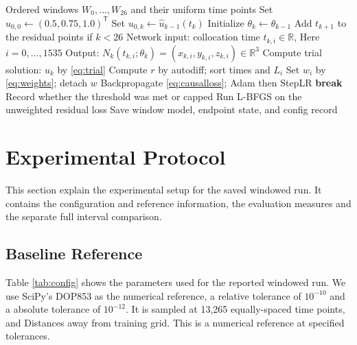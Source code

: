 \documentclass[conference]{IEEEtran}
\begin{document}
\begin{algorithm}[t]
\caption{Sequential causal window training}
\label{alg:training}
\begin{algorithmic}[1]
\Require Ordered windows $W_0,\ldots,W_{26}$ and their uniform time points
\State Set $u_{0,0}\gets (0.5,0.75,1.0)^\mathsf{T}$
    \State Set $u_{0,k}\gets\hat{u}_{k-1}(t_k)$
    \State Initialize $\theta_k\gets\theta_{k-1}$
  \EndIf
  \State Add $t_{k+1}$ to the residual points if $k<26$
      \State Network input: collocation time $t_{k,i}\in\mathbb{R}$, 
        \State Here  $i=0,\ldots,1535$
      \State Output: $N_k(t_{k,i};\theta_k)=(x_{k,i},y_{k,i},z_{k,i})\in\mathbb{R}^3$
      \State Compute trial solution: $u_k$ by \eqref{eq:trial}
      \State Compute $r$ by autodiff; sort times and $L_i$
      \State Set $w_i$ by \eqref{eq:weights}; detach $w$
      \State Backpropagate \eqref{eq:causalloss}; Adam then StepLR
        \State \textbf{break}
      \EndIf
    \EndFor
    \State Record whether the threshold was met or capped
  \EndFor
  \State Run L-BFGS on the unweighted residual loss
  \State Save window model, endpoint state, and config record
\EndFor
\end{algorithmic}
\end{algorithm}

\section{Experimental Protocol}
This section explain the experimental setup for the saved windowed run. It contains the configuration and reference information, the evaluation measures and the separate full interval comparison.




\subsection{Baseline Reference}




Table \ref{tab:config} shows the parameters used for the reported windowed run. We use SciPy’s DOP853 \cite{virtanen2020} as the numerical reference, a relative tolerance of $10^{-10}$ and a absolute tolerance of $10^{-12}$. It is sampled at 13,265 equally-spaced time points, and Distances away from training grid. This is a numerical reference at specified tolerances.
\end{document}
